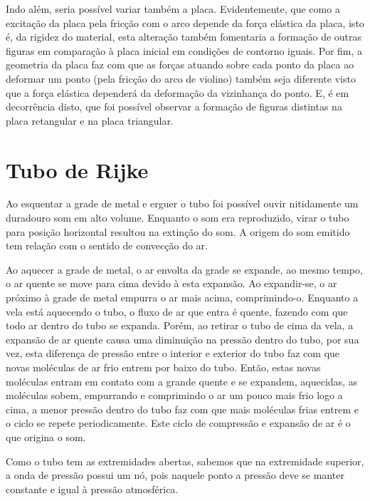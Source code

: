 Indo além, seria possível variar também a placa. Evidentemente, que como a excitação da placa pela fricção com o arco depende da força elástica da placa, isto é, da rigidez do material, esta alteração também fomentaria a formação de outras figuras em comparação à placa inicial em condições de contorno iguais. Por fim, a geometria da placa faz com que as forças atuando sobre cada ponto da placa ao deformar um ponto (pela fricção do arco de violino) também seja diferente visto que a força elástica dependerá da deformação da vizinhança do ponto. E, é em decorrência disto, que foi possível observar a formação de figuras distintas na placa retangular e na placa triangular. 

\section{Tubo de Rijke}

Ao esquentar a grade de metal e erguer o tubo foi possível ouvir nitidamente um duradouro som em alto volume. Enquanto o som era reproduzido, virar o tubo para posição horizontal resultou na extinção do som. A origem do som emitido tem relação com o sentido de convecção do ar.

Ao aquecer a grade de metal, o ar envolta da grade se expande, ao mesmo tempo, o ar quente se move para cima devido à esta expansão. Ao expandir-se, o ar próximo à grade de metal empurra o ar mais acima, comprimindo-o. Enquanto a vela está aquecendo o tubo, o fluxo de ar que entra é quente, fazendo com que todo ar dentro do tubo se expanda. Porém, ao retirar o tubo de cima da vela, a expansão de ar quente causa uma diminuição na pressão dentro do tubo, por sua vez, esta diferença de pressão entre o interior e exterior do tubo faz com que novas moléculas de ar frio entrem por baixo do tubo. Então, estas novas moléculas entram em contato com a grande quente e se expandem, aquecidas, as moléculas sobem, empurrando e comprimindo o ar um pouco mais frio logo a cima, a menor pressão dentro do tubo faz com que mais moléculas frias entrem e o ciclo se repete periodicamente. Este ciclo de compressão e expansão de ar é o que origina o som. 

Como o tubo tem as extremidades abertas, sabemos que na extremidade superior, a onda de pressão possui um nó, pois naquele ponto a pressão deve se manter constante e igual à pressão atmosférica. 
